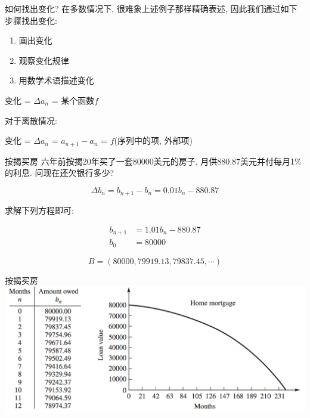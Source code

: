 \documentclass[
  ignorenonframetext,
]{ctexbeamer}
\providecommand{\tightlist}{%
  \setlength{\itemsep}{0pt}\setlength{\parskip}{0pt}}\usepackage{longtable,booktabs,array}
\begin{document}
\begin{frame}{如何找出变化?}
\label{ux5982ux4f55ux627eux51faux53d8ux5316}
在多数情况下, 很难象上述例子那样精确表述, 因此我们通过如下步骤找出变化:

\begin{tcolorbox}[enhanced jigsaw, bottomrule=.15mm, bottomtitle=1mm, titlerule=0mm, coltitle=black, arc=.35mm, title=\textcolor{quarto-callout-important-color}{\faExclamation}\hspace{0.5em}{Important}, toptitle=1mm, colbacktitle=quarto-callout-important-color!10!white, colback=white, opacitybacktitle=0.6, colframe=quarto-callout-important-color-frame, rightrule=.15mm, toprule=.15mm, leftrule=.75mm, breakable, left=2mm, opacityback=0]

\begin{enumerate}
\tightlist
\item
  画出变化
\item
  观察变化规律
\item
  用数学术语描述变化
\end{enumerate}

\end{tcolorbox}

变化 = \(\Delta a_n\) = 某个函数\(f\)

对于离散情况:

变化 = \(\Delta a_n\) = \(a_{n+1} - a_n\) = \(f\)(序列中的项, 外部项)
\end{frame}

\begin{frame}{按揭买房}
\label{ux6309ux63edux4e70ux623f}
六年前按揭20年买了一套80000美元的房子, 月供880.87美元并付每月1\%的利息.
问现在还欠银行多少?

\[\Delta b_n = b_{n+1} - b_n = 0.01b_n - 880.87\]

求解下列方程即可:

\[
\begin{align*}
b_{n+1} &= 1.01b_n - 880.87 \\
b_0 &= 80000
\end{align*}
\]

\[B = (80000, 79919.13, 79837.45, \cdots)\]
\end{frame}

\begin{frame}{按揭买房}
\label{ux6309ux63edux4e70ux623f-1}
\includegraphics{mort.png}
\end{frame}
\end{document}

